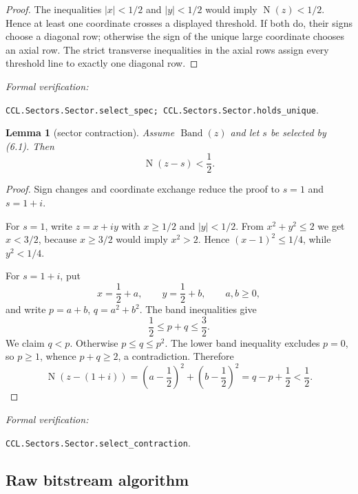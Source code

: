 \documentclass[10pt]{article}
\newtheorem{lemma}[theorem]{Lemma}
\theoremstyle{definition}
\theoremstyle{remark}
\newcommand{\Norm}{\operatorname{N}}
\newcommand{\leanref}[1]{\par\smallskip\noindent
  \emph{Formal verification:}\par\nobreak
  {\raggedright\nolinkurl{#1}.\par}}
\begin{document}
\begin{proof}
The inequalities $|x|<1/2$ and $|y|<1/2$ would imply $\Norm(z)<1/2$.  Hence at least one coordinate crosses a displayed threshold.  If both do, their signs choose a diagonal row; otherwise the sign of the unique large coordinate chooses an axial row.  The strict transverse inequalities in the axial rows assign every threshold line to exactly one diagonal row.
\end{proof}

\leanref{CCL.Sectors.Sector.select_spec; CCL.Sectors.Sector.holds_unique}

\begin{lemma}[sector contraction]\label{lem:sector-contraction}
Assume $\operatorname{Band}(z)$ and let $s$ be selected by (6.1).  Then
\[
 \Norm(z-s)<\frac12.
\]
\end{lemma}

\begin{proof}
Sign changes and coordinate exchange reduce the proof to $s=1$ and $s=1+i$.

For $s=1$, write $z=x+iy$ with $x\ge1/2$ and $|y|<1/2$.  From $x^2+y^2\le2$ we get $x<3/2$, because $x\ge3/2$ would imply $x^2>2$.  Hence $(x-1)^2\le1/4$, while $y^2<1/4$.

For $s=1+i$, put
\[
 x=\frac12+a,\qquad y=\frac12+b,
 \qquad a,b\ge0,
\]
and write $p=a+b$, $q=a^2+b^2$.  The band inequalities give
\[
 \frac12\le p+q\le\frac32.
\]
We claim $q<p$.  Otherwise $p\le q\le p^2$.  The lower band inequality excludes $p=0$, so $p\ge1$, whence $p+q\ge2$, a contradiction.  Therefore
\[
 \Norm(z-(1+i))
 =\left(a-\frac12\right)^2+\left(b-\frac12\right)^2
 =q-p+\frac12<\frac12.
\]
\end{proof}

\leanref{CCL.Sectors.Sector.select_contraction}

\subsection{Raw bitstream algorithm}
\end{document}
